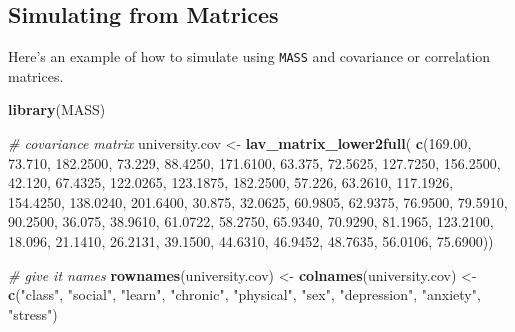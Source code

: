 \documentclass[
  man,floatsintext]{apa7}
\newenvironment{Shaded}{\begin{snugshade}}{\end{snugshade}}
\newcommand{\CommentTok}[1]{\textcolor[rgb]{0.56,0.35,0.01}{\textit{#1}}}
\newcommand{\FloatTok}[1]{\textcolor[rgb]{0.00,0.00,0.81}{#1}}
\newcommand{\FunctionTok}[1]{\textcolor[rgb]{0.13,0.29,0.53}{\textbf{#1}}}
\newcommand{\NormalTok}[1]{#1}
\newcommand{\OtherTok}[1]{\textcolor[rgb]{0.56,0.35,0.01}{#1}}
\newcommand{\StringTok}[1]{\textcolor[rgb]{0.31,0.60,0.02}{#1}}
\begin{document}
\normalsize

\newpage

\subsection{Simulating from Matrices}\label{simulating-from-matrices}

Here's an example of how to simulate using \texttt{MASS} and covariance or correlation matrices.

\small

\begin{Shaded}
\begin{Highlighting}[]
\FunctionTok{library}\NormalTok{(MASS)}

\CommentTok{\# covariance matrix}
\NormalTok{university.cov }\OtherTok{\textless{}{-}} \FunctionTok{lav\_matrix\_lower2full}\NormalTok{(}
    \FunctionTok{c}\NormalTok{(}\FloatTok{169.00}\NormalTok{, }
      \FloatTok{73.710}\NormalTok{, }\FloatTok{182.2500}\NormalTok{,}
      \FloatTok{73.229}\NormalTok{, }\FloatTok{88.4250}\NormalTok{, }\FloatTok{171.6100}\NormalTok{,}
      \FloatTok{63.375}\NormalTok{, }\FloatTok{72.5625}\NormalTok{, }\FloatTok{127.7250}\NormalTok{, }\FloatTok{156.2500}\NormalTok{,}
      \FloatTok{42.120}\NormalTok{, }\FloatTok{67.4325}\NormalTok{, }\FloatTok{122.0265}\NormalTok{, }\FloatTok{123.1875}\NormalTok{, }\FloatTok{182.2500}\NormalTok{,}
      \FloatTok{57.226}\NormalTok{, }\FloatTok{63.2610}\NormalTok{, }\FloatTok{117.1926}\NormalTok{, }\FloatTok{154.4250}\NormalTok{, }\FloatTok{138.0240}\NormalTok{, }\FloatTok{201.6400}\NormalTok{,}
      \FloatTok{30.875}\NormalTok{, }\FloatTok{32.0625}\NormalTok{, }\FloatTok{60.9805}\NormalTok{, }\FloatTok{62.9375}\NormalTok{, }\FloatTok{76.9500}\NormalTok{, }\FloatTok{79.5910}\NormalTok{, }\FloatTok{90.2500}\NormalTok{,}
      \FloatTok{36.075}\NormalTok{, }\FloatTok{38.9610}\NormalTok{, }\FloatTok{61.0722}\NormalTok{, }\FloatTok{58.2750}\NormalTok{, }\FloatTok{65.9340}\NormalTok{, }\FloatTok{70.9290}\NormalTok{, }\FloatTok{81.1965}\NormalTok{, }\FloatTok{123.2100}\NormalTok{,}
      \FloatTok{18.096}\NormalTok{, }\FloatTok{21.1410}\NormalTok{, }\FloatTok{26.2131}\NormalTok{, }\FloatTok{39.1500}\NormalTok{, }\FloatTok{44.6310}\NormalTok{, }\FloatTok{46.9452}\NormalTok{, }\FloatTok{48.7635}\NormalTok{, }\FloatTok{56.0106}\NormalTok{, }\FloatTok{75.6900}\NormalTok{))}

\CommentTok{\# give it names}
\FunctionTok{rownames}\NormalTok{(university.cov) }\OtherTok{\textless{}{-}}
    \FunctionTok{colnames}\NormalTok{(university.cov) }\OtherTok{\textless{}{-}}
    \FunctionTok{c}\NormalTok{(}\StringTok{"class"}\NormalTok{, }\StringTok{"social"}\NormalTok{, }\StringTok{"learn"}\NormalTok{, }\StringTok{"chronic"}\NormalTok{, }\StringTok{"physical"}\NormalTok{, }\StringTok{"sex"}\NormalTok{, }
      \StringTok{"depression"}\NormalTok{, }\StringTok{"anxiety"}\NormalTok{, }\StringTok{"stress"}\NormalTok{)}


\end{Highlighting}
\end{Shaded}
\end{document}
